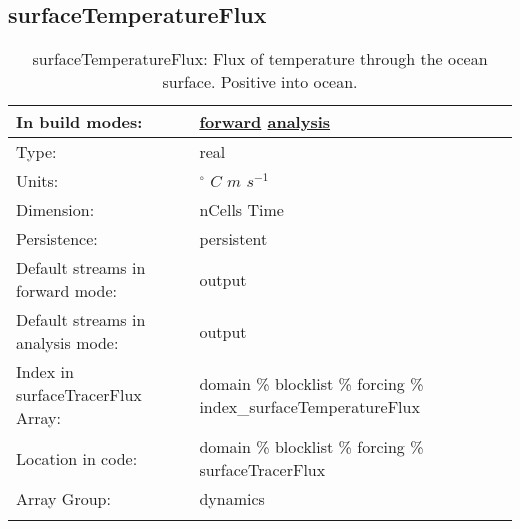 \subsection[surfaceTemperatureFlux]{surfaceTemperatureFlux}
\label{subsec:var_sec_forcing_surfaceTemperatureFlux}
\begin{center}
\begin{longtable}{| p{2.0in} | p{4.0in} |}
        \hline 
        In build modes: & \hyperref[subsec:forward_var_tab_forcing]{forward} \hyperref[subsec:analysis_var_tab_forcing]{analysis} \\
        \hline 
        Type: & real \\
        \hline 
        Units: & $^\circ$ $C$ $m$ $s^{-1}$ \\
        \hline 
        Dimension: & nCells Time \\
        \hline 
        Persistence: & persistent \\
        \hline 
		 Default streams in forward mode: &  output \\
        \hline 
		 Default streams in analysis mode: &  output \\
        \hline 
		 Index in surfaceTracerFlux Array: & domain \% blocklist \% forcing \% index\_surfaceTemperatureFlux \\
		 \hline 
		 Location in code: & domain \% blocklist \% forcing \% surfaceTracerFlux \\
		 \hline 
		 Array Group: & dynamics \\
		 \hline 
    \caption{surfaceTemperatureFlux: Flux of temperature through the ocean surface. Positive into ocean.}
\end{longtable}
\end{center}
